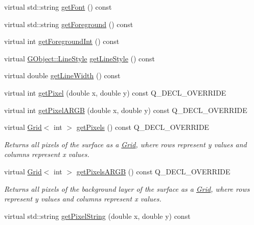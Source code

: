 \begin{DoxyCompactItemize}
\item 
virtual std\+::string \mbox{\hyperlink{classGDrawingSurface_a894a5502900794eeb27d084c21f1d77d}{get\+Font}} () const
\item 
virtual std\+::string \mbox{\hyperlink{classGDrawingSurface_a4fa2d8b0192a3a5b4af4bbfe71194d03}{get\+Foreground}} () const
\item 
virtual int \mbox{\hyperlink{classGDrawingSurface_ac3b12ab385a6ef9ae90fc879860ba726}{get\+Foreground\+Int}} () const
\item 
virtual \mbox{\hyperlink{classGObject_a86e0f5648542856159bb40775c854aa7}{G\+Object\+::\+Line\+Style}} \mbox{\hyperlink{classGDrawingSurface_aaf1f5ea8281e5e3486662878d26f0a13}{get\+Line\+Style}} () const
\item 
virtual double \mbox{\hyperlink{classGDrawingSurface_a85ff266dc3eb63d9f2d8e5a4487fd3c0}{get\+Line\+Width}} () const
\item 
virtual int \mbox{\hyperlink{classGForwardDrawingSurface_a076754305680c65782a00ddd3c77b50b}{get\+Pixel}} (double x, double y) const Q\+\_\+\+D\+E\+C\+L\+\_\+\+O\+V\+E\+R\+R\+I\+DE
\item 
virtual int \mbox{\hyperlink{classGForwardDrawingSurface_ac1016456426446714a53d29da622f2ec}{get\+Pixel\+A\+R\+GB}} (double x, double y) const Q\+\_\+\+D\+E\+C\+L\+\_\+\+O\+V\+E\+R\+R\+I\+DE
\item 
virtual \mbox{\hyperlink{classGrid}{Grid}}$<$ int $>$ \mbox{\hyperlink{classGForwardDrawingSurface_a430b4965720f3b35f10062a252883e75}{get\+Pixels}} () const Q\+\_\+\+D\+E\+C\+L\+\_\+\+O\+V\+E\+R\+R\+I\+DE
\begin{DoxyCompactList}\small\item\em Returns all pixels of the surface as a \mbox{\hyperlink{classGrid}{Grid}}, where rows represent y values and columns represent x values. \end{DoxyCompactList}\item 
virtual \mbox{\hyperlink{classGrid}{Grid}}$<$ int $>$ \mbox{\hyperlink{classGForwardDrawingSurface_aca5a19f5f53c5cd29b832a769fde4f68}{get\+Pixels\+A\+R\+GB}} () const Q\+\_\+\+D\+E\+C\+L\+\_\+\+O\+V\+E\+R\+R\+I\+DE
\begin{DoxyCompactList}\small\item\em Returns all pixels of the background layer of the surface as a \mbox{\hyperlink{classGrid}{Grid}}, where rows represent y values and columns represent x values. \end{DoxyCompactList}\item 
virtual std\+::string \mbox{\hyperlink{classGDrawingSurface_a8da04ef488ec5fa498fbbffaf50928fd}{get\+Pixel\+String}} (double x, double y) const

\end{DoxyCompactItemize}
